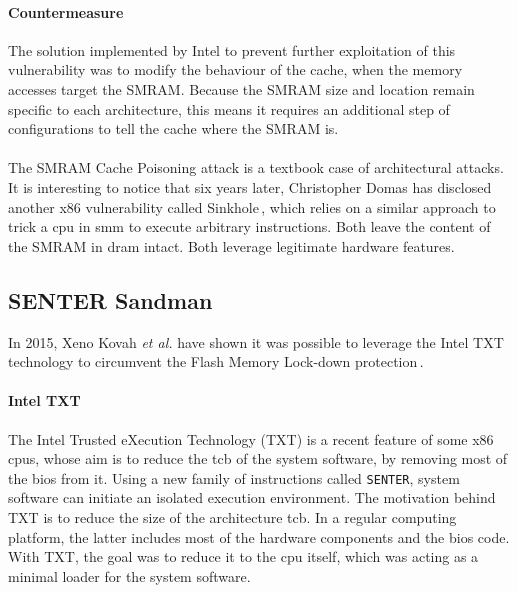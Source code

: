 \paragraph{Countermeasure}
%
The solution implemented by Intel to prevent further exploitation of this
vulnerability was to modify the behaviour of the cache, when the memory accesses
target the SMRAM.
%
Because the SMRAM size and location remain specific to each architecture, this
means it requires an additional step of configurations to tell the cache where
the SMRAM is. 
%

\paragraph{}
%
The SMRAM Cache Poisoning attack is a textbook case  of architectural attacks.
%
It is interesting to notice that six years later, Christopher Domas has
disclosed another x86 vulnerability called Sinkhole\,\cite{domas2015sinkhole},
which relies on a similar approach to trick a \ac{cpu} in \ac{smm} to execute
arbitrary instructions.
%
Both leave the content of the SMRAM in \ac{dram} intact.
%
Both leverage legitimate hardware features. 


\subsection{SENTER Sandman}
\label{subsec:usecase:hse:sandman}

In 2015, Xeno Kovah \emph{et al.} have shown  it was possible to leverage the
Intel TXT technology to circumvent the Flash Memory Lock-down
protection\,\cite{kovah2015senter}.

\paragraph{Intel TXT}
The Intel Trusted eXecution Technology (TXT) is a recent feature of some x86
\acp{cpu}, whose aim is to reduce the \ac{tcb} of the system software, by
removing most of the \ac{bios} from it.
%
Using a new family of instructions called \texttt{SENTER}, system software can
initiate an isolated execution environment.
%
The motivation behind TXT is to reduce the size of the architecture \ac{tcb}.
%
In a regular computing platform, the latter includes most of the hardware
components and the \ac{bios} code.
%
With TXT, the goal was to reduce it to the \ac{cpu} itself, which was acting as
a minimal loader for the system software.


